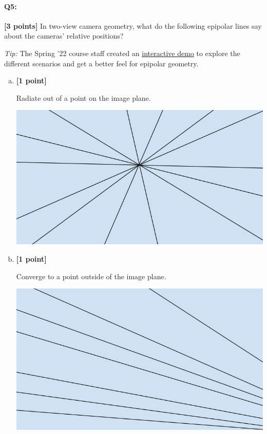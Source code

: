 
\pagebreak
\paragraph{Q5:} \textbf{[3 points]} In two-view camera geometry, what do the following epipolar lines say about the cameras' relative positions?

\textit{Tip:} The Spring '22 course staff created an \href{https://browncsci1430.github.io/webpage/demos/stereo_camera_visualization/index.html}{interactive demo} to explore the different scenarios and get a better feel for epipolar geometry.

\begin{enumerate}[(a)]
\item \textbf{[1 point]} 
\begin{tcolorbox}[colback=orange!5!white,colframe=orange!75!black]
Radiate out of a point on the image plane.
\end{tcolorbox}

\includegraphics[width = 0.5\linewidth]{images/epipolarlines-a.PNG}

\item \textbf{[1 point]}
\begin{tcolorbox}[colback=orange!5!white,colframe=orange!75!black]
Converge to a point outside of the image plane.
\end{tcolorbox}

\includegraphics[width = 0.5\linewidth]{images/epipolarlines-b.PNG}


\end{enumerate}
